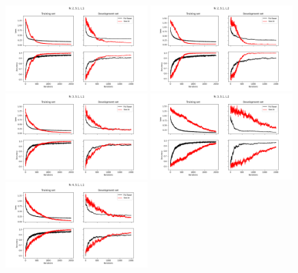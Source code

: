\begin{figure}[ht]
\centering
\includegraphics[width=0.49\textwidth]{figures/comparison/Epochs_2000--A_0.05--N_2--S_1--L_1.png}
\includegraphics[width=0.49\textwidth]{figures/comparison/Epochs_2000--A_0.05--N_2--S_1--L_2.png}
\includegraphics[width=0.49\textwidth]{figures/comparison/Epochs_2000--A_0.05--N_3--S_1--L_1.png}
\includegraphics[width=0.49\textwidth]{figures/comparison/Epochs_2000--A_0.05--N_3--S_1--L_2.png}
\includegraphics[width=0.49\textwidth]{figures/comparison/Epochs_2000--A_0.05--N_4--S_1--L_1.png}

\end{figure}
